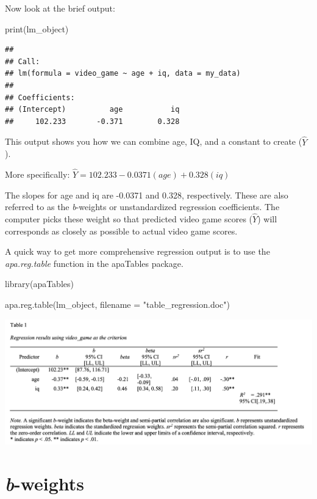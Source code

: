 \documentclass[
]{krantz}
\makeatletter
\newenvironment{Shaded}{\begin{snugshade}}{\end{snugshade}}
\newcommand{\AttributeTok}[1]{\textcolor[rgb]{0.61,0.61,0.61}{#1}}
\newcommand{\FunctionTok}[1]{\textcolor[rgb]{0,0,0}{#1}}
\newcommand{\NormalTok}[1]{#1}
\newcommand{\StringTok}[1]{\textcolor[rgb]{0.5,0.5,0.5}{#1}}
\newenvironment{kframe}{%
\medskip{}
\setlength{\fboxsep}{.8em}
 \def\at@end@of@kframe{}%
 \ifinner\ifhmode%
  \def\at@end@of@kframe{\end{minipage}}%
  \begin{minipage}{\columnwidth}%
 \fi\fi%
 \def\FrameCommand##1{\hskip\@totalleftmargin \hskip-\fboxsep
 \colorbox{shadecolor}{##1}\hskip-\fboxsep
     \hskip-\linewidth \hskip-\@totalleftmargin \hskip\columnwidth}%
 \MakeFramed {\advance\hsize-\width
   \@totalleftmargin\z@ \linewidth\hsize
   \@setminipage}}%
 {\par\unskip\endMakeFramed%
 \at@end@of@kframe}
\renewenvironment{Shaded}{\begin{kframe}}{\end{kframe}}
\makeatother
\begin{document}
Now look at the brief output:

\begin{Shaded}
\begin{Highlighting}[]
\FunctionTok{print}\NormalTok{(lm\_object)}
\end{Highlighting}
\end{Shaded}

\begin{verbatim}
## 
## Call:
## lm(formula = video_game ~ age + iq, data = my_data)
## 
## Coefficients:
## (Intercept)          age           iq  
##     102.233       -0.371        0.328
\end{verbatim}

This output shows you how we can combine age, IQ, and a constant to create (\(\widehat{Y}\)).

More specifically:
\(\widehat{Y} = 102.233 - 0.0371(age) + 0.328(iq)\)

The slopes for age and iq are -0.0371 and 0.328, respectively. These are also referred to as the \emph{b}-weights or unstandardized regression coefficients. The computer picks these weight so that predicted video game scores (\(\widehat{Y}\)) will corresponds as closely as possible to actual video game scores.

A quick way to get more comprehensive regression output is to use the \emph{apa.reg.table} function in the apaTables package.

\begin{Shaded}
\begin{Highlighting}[]
\FunctionTok{library}\NormalTok{(apaTables)}

\FunctionTok{apa.reg.table}\NormalTok{(lm\_object,}
              \AttributeTok{filename =} \StringTok{"table\_regression.doc"}\NormalTok{)}
\end{Highlighting}
\end{Shaded}

\includegraphics[width=0.9\linewidth]{ch_multiple_regression/images/mr_table}

\hypertarget{b-weights}{%
\section{\texorpdfstring{\emph{b}-weights}{b-weights}}\label{b-weights}}
\end{document}
